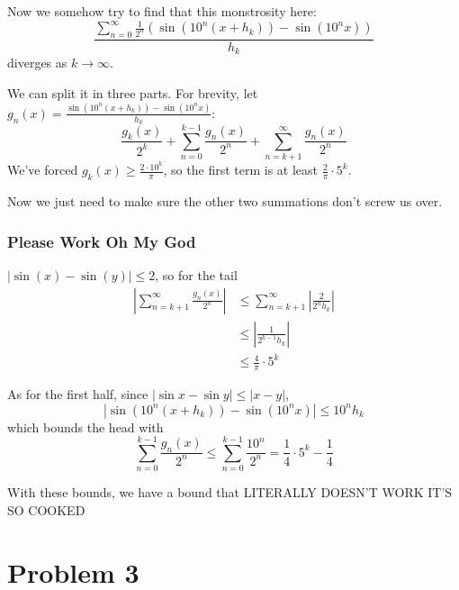 \documentclass[12pt]{article}
\begin{document}
Now we somehow try to find that this monstrosity here:
\[\frac{\sum_{n=0}^{\infty} \frac{1}{2^n}\left(\sin\left(10^n(x+h_k)\right)-\sin\left(10^nx\right)\right)}{h_k}\]
diverges as $k \to \infty$.

We can split it in three parts.
For brevity, let $g_n(x)=\frac{\sin\left(10^n(x+h_k)\right)-\sin\left(10^nx\right)}{h_k}$:
\[\frac{g_k(x)}{2^k}+\sum_{n=0}^{k-1} \frac{g_n(x)}{2^n}+\sum_{n=k+1}^{\infty} \frac{g_n(x)}{2^n}\]
We've forced $g_k(x) \ge \frac{2 \cdot 10^k}{\pi}$,
so the first term is at least $\frac{2}{\pi} \cdot 5^k$.

Now we just need to make sure the other two summations don't screw us over.

\subsubsection{Please Work Oh My God}

$|\sin(x)-\sin(y)| \le 2$, so for the tail
\begin{align*}
  \left|\sum_{n=k+1}^{\infty} \frac{g_n(x)}{2^n}\right|
   & \le \sum_{n=k+1}^{\infty} \left|\frac{2}{2^n h_k}\right| \\
   & \le \left|\frac{1}{2^{k-1}h_k}\right|                    \\
   & \le \frac{4}{\pi} \cdot 5^k
\end{align*}

As for the first half, since $|\sin x - \sin y| \le |x-y|$,
\[\left|\sin\left(10^n(x+h_k)\right)-\sin\left(10^nx\right)\right| \le 10^nh_k\]
which bounds the head with
\[\sum_{n=0}^{k-1} \frac{g_n(x)}{2^n} \le \sum_{n=0}^{k-1} \frac{10^n}{2^n}=\frac{1}{4} \cdot 5^k - \frac{1}{4}\]

With these bounds, we have a bound that LITERALLY DOESN'T WORK IT'S SO COOKED

\pagebreak

\section{Problem 3}
\end{document}
